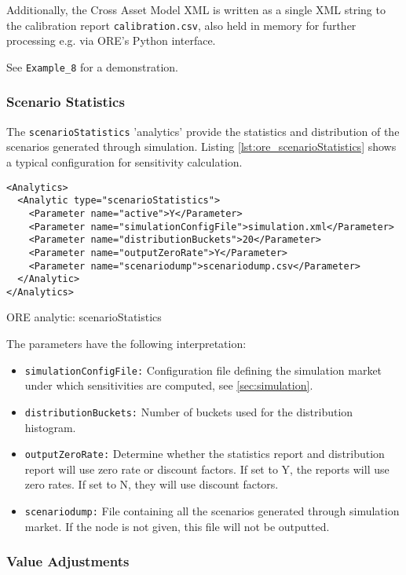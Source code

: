 {Additionally, the Cross Asset Model XML is written as a single XML string to the calibration report {\tt calibration.csv}, also held in
memory for further processing e.g. via ORE's Python interface.

See {\tt Example\_8} for a demonstration.

\subsubsection{Scenario Statistics}

The {\tt scenarioStatistics} 'analytics' provide the statistics and distribution of the scenarios generated through simulation. Listing \ref{lst:ore_scenarioStatistics}
shows a typical configuration for sensitivity calculation.

\begin{listing}[H]
\begin{verbatim}
<Analytics>
  <Analytic type="scenarioStatistics">
	<Parameter name="active">Y</Parameter>
	<Parameter name="simulationConfigFile">simulation.xml</Parameter>
	<Parameter name="distributionBuckets">20</Parameter>
	<Parameter name="outputZeroRate">Y</Parameter>
	<Parameter name="scenariodump">scenariodump.csv</Parameter>
  </Analytic>
</Analytics>
\end{verbatim}
\caption{ORE analytic: scenarioStatistics}
\label{lst:ore_scenarioStatistics}
\end{listing}

The parameters have the following interpretation:

\begin{itemize}
\item {\tt simulationConfigFile:} Configuration file defining the simulation market under which sensitivities are computed,
  see \ref{sec:simulation}.
\item {\tt distributionBuckets:} Number of buckets used for the distribution histogram.
\item {\tt outputZeroRate:} Determine whether the statistics report and distribution report will use zero rate or discount factors. If set to Y, the reports will use zero rates. If set to N, they will use discount factors.
\item {\tt scenariodump:} File containing all the scenarios generated through simulation market. If the node is not given, this file will not be outputted.
\end{itemize}

\subsubsection{Value Adjustments}

}
